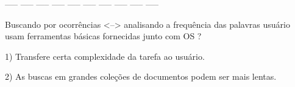 








----- ----- ----- ----- ----- ----- ----- ----- ----- -----


Buscando por ocorrências <--> analisando a frequência das palavras
usuário usam ferramentas básicas fornecidas junto com OS ?


1) Transfere certa complexidade da tarefa ao usuário.

2) As buscas em grandes coleções de documentos podem ser mais lentas. 

